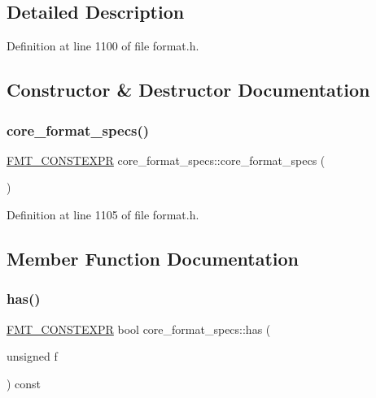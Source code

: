 \subsection{Detailed Description}


Definition at line 1100 of file format.\+h.



\subsection{Constructor \& Destructor Documentation}
\mbox{\label{structcore__format__specs_a06ea7bc4271a8c25cbda18f28b04004d}} 
\subsubsection{\texorpdfstring{core\+\_\+format\+\_\+specs()}{core\_format\_specs()}}
{\footnotesize\ttfamily \hyperlink{core_8h_a69201cb276383873487bf68b4ef8b4cd}{F\+M\+T\+\_\+\+C\+O\+N\+S\+T\+E\+X\+PR} core\+\_\+format\+\_\+specs\+::core\+\_\+format\+\_\+specs (\begin{DoxyParamCaption}{ }\end{DoxyParamCaption})\hspace{0.3cm}{\ttfamily [inline]}}



Definition at line 1105 of file format.\+h.



\subsection{Member Function Documentation}
\mbox{\label{structcore__format__specs_ac782db831425212c5513c61bde1c8f20}} 
\subsubsection{\texorpdfstring{has()}{has()}}
{\footnotesize\ttfamily \hyperlink{core_8h_a69201cb276383873487bf68b4ef8b4cd}{F\+M\+T\+\_\+\+C\+O\+N\+S\+T\+E\+X\+PR} bool core\+\_\+format\+\_\+specs\+::has (\begin{DoxyParamCaption}\item[{unsigned}]{f }\end{DoxyParamCaption}) const\hspace{0.3cm}{\ttfamily [inline]}}




